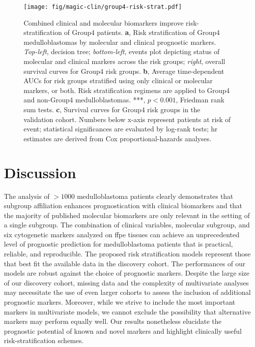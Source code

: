 \clearpage

\begin{figure}[h]
	\begin{center}
		\texttt{[image: fig/magic-clin/group4-risk-strat.pdf]}
	\end{center}
	\caption[Combined clinical and molecular biomarkers improve risk-stratification of Group4 patients]
	{Combined clinical and molecular biomarkers improve risk-stratification of Group4 patients.
	\textbf{a}, Risk stratification of Group4 medulloblastomas by molecular and clinical prognostic markers. \emph{Top-left}, decision tree; \emph{bottom-left}, events plot depicting status of molecular and clinical markers across the risk groups; \emph{right}, overall survival curves for Group4 risk groups.
	\textbf{b}, Average time-dependent AUCs for risk groups stratified using only clinical or molecular markers, or both. Risk stratification regimens are applied to Group4 and non-Group4 medulloblastomas. ***, $p < 0.001$, Friedman rank sum tests.
	\textbf{c}, Survival curves for Group4 risk groups in the validation cohort. 
	Numbers below x-axis represent patients at risk of event; statistical significances are evaluated by log-rank tests; \gls{hr} estimates are derived from Cox proportional-hazards analyses.
	}
	\label{fig:group4-risk-strat}
\end{figure}

\clearpage


\section{Discussion}

The analysis of $> 1000$ medulloblastoma patients clearly demonstrates that subgroup affiliation enhances prognostication with clinical biomarkers and that the majority of published molecular biomarkers are only relevant in the setting of a single subgroup. The combination of clinical variables, molecular subgroup, and six cytogenetic markers analyzed on \gls{ffpe} tissues can achieve an unprecedented level of prognostic prediction for medulloblastoma patients that is practical, reliable, and reproducible. The proposed risk stratification models represent those that best fit the available data in the discovery cohort. The performances of our models are robust against the choice of prognostic markers. Despite the large size of our discovery cohort, missing data and the complexity of multivariate analyses may necessitate the use of even larger cohorts to assess the inclusion of additional prognostic markers. Moreover, while we strive to include the most important markers in multivariate models, we cannot exclude the possibility that alternative markers may perform equally well. Our results nonetheless elucidate the prognostic potential of known and novel markers and highlight clinically useful risk-stratification schemes.

